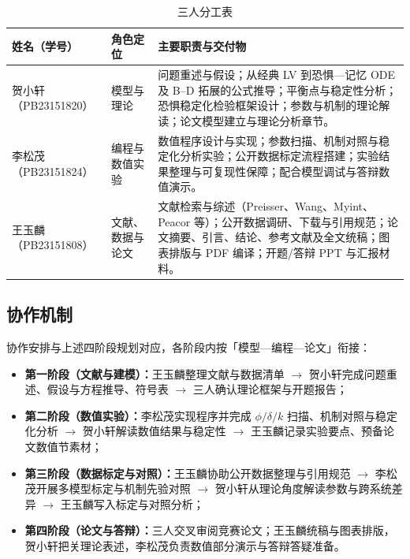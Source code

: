 \documentclass[12pt,a4paper]{ctexart}
\begin{document}
\begin{table}[h]
  \centering
  \caption{三人分工表}
  \begin{tabular}{p{2.8cm}p{2.5cm}p{7.5cm}}
    \toprule
    姓名（学号） & 角色定位 & 主要职责与交付物 \\
    \midrule
    贺小轩（PB23151820） &
    模型与理论 &
    问题重述与假设；从经典 LV 到恐惧—记忆 ODE 及 B--D 拓展的公式推导；平衡点与稳定性分析；恐惧稳定化检验框架设计；参数与机制的理论解读；论文模型建立与理论分析章节。 \\
    \midrule
    李松茂（PB23151824） &
    编程与数值实验 &
    数值程序设计与实现；参数扫描、机制对照与稳定化分析实验；公开数据标定流程搭建；实验结果整理与可复现性保障；配合模型调试与答辩数值演示。 \\
    \midrule
    王玉麟（PB23151808） &
    文献、数据与论文 &
    文献检索与综述（Preisser、Wang、Myint、Peacor 等）；公开数据调研、下载与引用规范；论文摘要、引言、结论、参考文献及全文统稿；图表排版与 PDF 编译；开题/答辩 PPT 与汇报材料。 \\
    \bottomrule
  \end{tabular}
\end{table}

\subsection{协作机制}

协作安排与上述四阶段规划对应，各阶段内按「模型—编程—论文」衔接：

\begin{itemize}[leftmargin=2em]
  \item \textbf{第一阶段（文献与建模）：}王玉麟整理文献与数据清单 $\rightarrow$ 贺小轩完成问题重述、假设与方程推导、符号表 $\rightarrow$ 三人确认理论框架与开题报告；
  \item \textbf{第二阶段（数值实验）：}李松茂实现程序并完成 $\phi/\delta/k$ 扫描、机制对照与稳定化分析 $\rightarrow$ 贺小轩解读数值结果与稳定性 $\rightarrow$ 王玉麟记录实验要点、预备论文数值节素材；
  \item \textbf{第三阶段（数据标定与对照）：}王玉麟协助公开数据整理与引用规范 $\rightarrow$ 李松茂开展多模型标定与机制先验对照 $\rightarrow$ 贺小轩从理论角度解读参数与跨系统差异 $\rightarrow$ 王玉麟写入标定与对照分析；
  \item \textbf{第四阶段（论文与答辩）：}三人交叉审阅竞赛论文；王玉麟统稿与图表排版，贺小轩把关理论表述，李松茂负责数值部分演示与答辩答疑准备。
\end{itemize}
\end{document}
